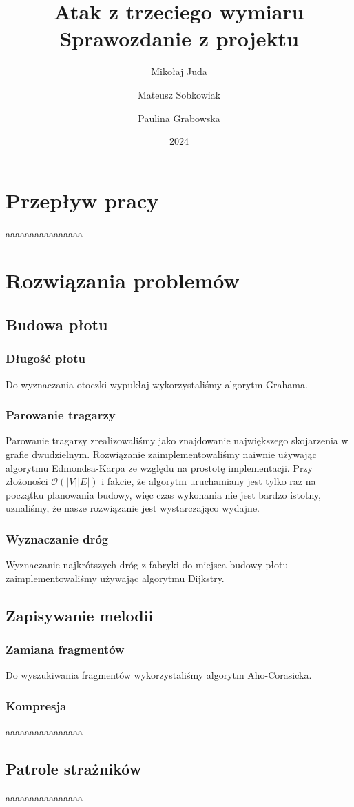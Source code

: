\documentclass{article}
\title{Atak z trzeciego wymiaru \\\large Sprawozdanie z projektu}
\author{Mikołaj Juda \and Mateusz Sobkowiak \and Paulina Grabowska}
\date{2024}
\begin{document}
\maketitle
\section{Przepływ pracy}
aaaaaaaaaaaaaaaa

\section{Rozwiązania problemów}

\subsection{Budowa płotu}

\subsubsection{Długość płotu}
Do wyznaczania otoczki wypukłaj wykorzystaliśmy algorytm Grahama.
\subsubsection{Parowanie tragarzy}
Parowanie tragarzy zrealizowaliśmy jako znajdowanie największego skojarzenia w grafie dwudzielnym.
Rozwiązanie zaimplementowaliśmy naiwnie używając algorytmu Edmondsa-Karpa ze względu na prostotę implementacji.
Przy złożoności \(\mathcal{O}(|V||E|)\)\cite{cs6820matchingnotes}
i fakcie, że algorytm uruchamiany jest tylko raz na początku planowania budowy, więc czas wykonania nie jest bardzo istotny,
uznaliśmy, że nasze rozwiązanie jest wystarczająco wydajne.
\subsubsection{Wyznaczanie dróg}
Wyznaczanie najkrótszych dróg z fabryki do miejsca budowy płotu zaimplementowaliśmy używając algorytmu Dijkstry.

\subsection{Zapisywanie melodii}
\subsubsection{Zamiana fragmentów}
Do wyszukiwania fragmentów wykorzystaliśmy algorytm Aho-Corasicka.
\subsubsection{Kompresja}
aaaaaaaaaaaaaaaa

\subsection{Patrole strażników}
aaaaaaaaaaaaaaaa

\printbibliography[heading=bibintoc]
\end{document}
